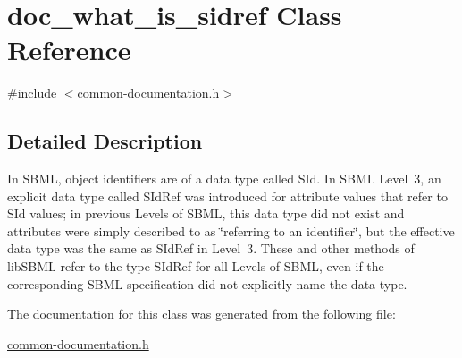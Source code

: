\hypertarget{classdoc__what__is__sidref}{}\section{doc\+\_\+what\+\_\+is\+\_\+sidref Class Reference}
\label{classdoc__what__is__sidref}


{\ttfamily \#include $<$common-\/documentation.\+h$>$}



\subsection{Detailed Description}
\begin{DoxyParagraph}{}

\end{DoxyParagraph}
In S\+B\+ML, object identifiers are of a data type called {\ttfamily S\+Id}. In S\+B\+ML Level~3, an explicit data type called {\ttfamily S\+Id\+Ref} was introduced for attribute values that refer to {\ttfamily S\+Id} values; in previous Levels of S\+B\+ML, this data type did not exist and attributes were simply described to as \char`\"{}referring to an identifier\char`\"{}, but the effective data type was the same as {\ttfamily S\+Id\+Ref} in Level~3. These and other methods of lib\+S\+B\+ML refer to the type {\ttfamily S\+Id\+Ref} for all Levels of S\+B\+ML, even if the corresponding S\+B\+ML specification did not explicitly name the data type. 

The documentation for this class was generated from the following file\+:\begin{DoxyCompactItemize}
\item 
\hyperlink{common-documentation_8h}{common-\/documentation.\+h}\end{DoxyCompactItemize}
